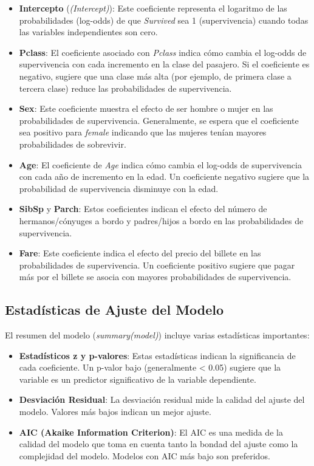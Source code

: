 \begin{itemize}
    \item \textbf{Intercepto} (\textit{(Intercept)}): Este coeficiente representa el logaritmo de las probabilidades (log-odds) de que \textit{Survived} sea 1 (supervivencia) cuando todas las variables independientes son cero.
    \item \textbf{Pclass}: El coeficiente asociado con \textit{Pclass} indica cómo cambia el log-odds de supervivencia con cada incremento en la clase del pasajero. Si el coeficiente es negativo, sugiere que una clase más alta (por ejemplo, de primera clase a tercera clase) reduce las probabilidades de supervivencia.
    \item \textbf{Sex}: Este coeficiente muestra el efecto de ser hombre o mujer en las probabilidades de supervivencia. Generalmente, se espera que el coeficiente sea positivo para \textit{female} indicando que las mujeres tenían mayores probabilidades de sobrevivir.
    \item \textbf{Age}: El coeficiente de \textit{Age} indica cómo cambia el log-odds de supervivencia con cada año de incremento en la edad. Un coeficiente negativo sugiere que la probabilidad de supervivencia disminuye con la edad.
    \item \textbf{SibSp} y \textbf{Parch}: Estos coeficientes indican el efecto del número de hermanos/cónyuges a bordo y padres/hijos a bordo en las probabilidades de supervivencia.
    \item \textbf{Fare}: Este coeficiente indica el efecto del precio del billete en las probabilidades de supervivencia. Un coeficiente positivo sugiere que pagar más por el billete se asocia con mayores probabilidades de supervivencia.
\end{itemize}

\subsection*{Estadísticas de Ajuste del Modelo}

El resumen del modelo (\textit{summary(model)}) incluye varias estadísticas importantes:

\begin{itemize}
    \item \textbf{Estadísticos z y p-valores}: Estas estadísticas indican la significancia de cada coeficiente. Un p-valor bajo (generalmente < 0.05) sugiere que la variable es un predictor significativo de la variable dependiente.
    \item \textbf{Desviación Residual}: La desviación residual mide la calidad del ajuste del modelo. Valores más bajos indican un mejor ajuste.
    \item \textbf{AIC (Akaike Information Criterion)}: El AIC es una medida de la calidad del modelo que toma en cuenta tanto la bondad del ajuste como la complejidad del modelo. Modelos con AIC más bajo son preferidos.
\end{itemize}

